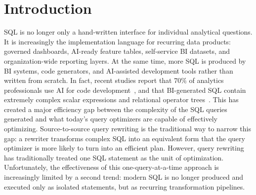 \section{Introduction}\label{sec:intro}

SQL is no longer only a hand-written interface for individual analytical questions. It is increasingly the implementation language for recurring data products: governed dashboards, AI-ready feature tables, self-service BI datasets, and organization-wide reporting layers. At the same time, more SQL is produced by BI systems, code generators, and AI-assisted development tools rather than written from scratch.  In fact, recent studies report  that 70\% of analytics professionals use AI for code development~\cite{dbt2025state}, and that  BI-generated SQL  contain extremely complex scalar expressions and relational operator trees~\cite{getreal2018}.
This has created a major efficiency gap between the complexity of the SQL queries generated and what today's query optimizers are capable of effectively optimizing. Source-to-source query rewriting is the traditional way to narrow this gap: a rewriter transforms complex SQL into an equivalent form that the query optimizer is more likely to turn into an efficient plan. However, query rewriting has traditionally treated one SQL statement as the unit of optimization. Unfortunately, the effectiveness of this one-query-at-a-time approach is increasingly limited by a second trend: modern SQL is no longer produced and executed only as isolated statements, but as recurring transformation pipelines.


